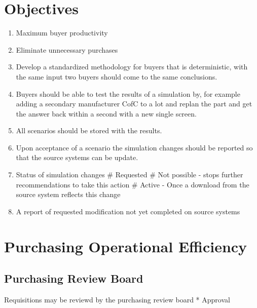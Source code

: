 \documentclass[letterpaper,10pt,english]{sphinxmanual}
\begin{document}
\section{Objectives}
\label{BusinessProcessReengineering:id6}\begin{enumerate}
\item {} 
Maximum buyer productivity

\item {} 
Eliminate unnecessary purchases

\item {} 
Develop a standardized methodology for buyers that is deterministic,
with the same input two buyers should come to the same conclusions.

\item {} 
Buyers should be able to test the results of a simulation by, for
example adding a secondary manufacturer CofC to a lot and replan the
part and get the answer back within a second with a new single
screen.

\item {} 
All scenarios should be stored with the results.

\item {} 
Upon acceptance of a scenario the simulation changes should be
reported so that the source systems can be update.

\item {} 
Status of simulation changes \# Requested \# Not possible - stops
further recommendations to take this action \# Active - Once a
download from the source system reflects this change

\item {} 
A report of requested modification not yet completed on source
systems

\end{enumerate}


\section{Purchasing Operational Efficiency}
\label{BusinessProcessReengineering:id7}

\subsection{Purchasing Review Board}
\label{BusinessProcessReengineering:id8}
\begin{DUlineblock}{0em}
\item[] Requisitions may be reviewd by the purchasing review board * Approval
\end{DUlineblock}
\end{document}
